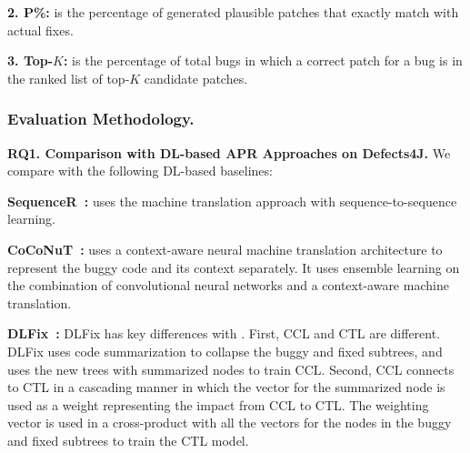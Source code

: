 {\bf 2. P\%:} is the percentage of generated plausible patches
that exactly match with actual fixes.

{\bf 3. Top-$K$:} is the percentage of total bugs in which a correct
patch for a bug is in the ranked list of top-$K$ candidate patches.

\subsubsection{Evaluation Methodology.\\}

{\bf RQ1. Comparison with DL-based APR Approaches on Defects4J.}
We compare {\tool} with the following
DL-based baselines:



{\bf SequenceR~\cite{chen2018sequencer}: } uses the machine
translation approach with sequence-to-sequence learning.

{\bf CoCoNuT~\cite{lutellier2020coconut}:} uses a context-aware neural
machine translation architecture to represent the buggy code
and its context separately.
It uses ensemble learning on the combination of convolutional neural
networks and a context-aware machine translation.

{\bf DLFix~\cite{icse20}:} DLFix has key differences with {\tool}.
First, CCL and CTL are different. DLFix uses code summarization to
collapse the buggy and fixed subtrees, and uses the new trees with
summarized nodes to train CCL. Second, CCL connects to CTL in a
cascading manner in which the vector for the summarized node is used
as a weight representing the impact from CCL to CTL. The weighting
vector is used in a cross-product with all the vectors for the nodes
in the buggy and fixed subtrees to train the CTL model.


